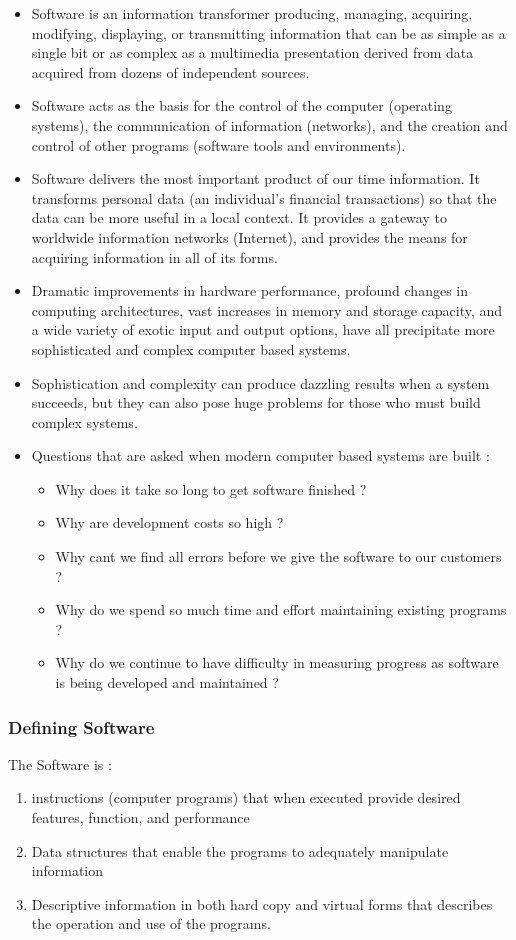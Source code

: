 \documentclass{article}
\begin{document}
	\begin{itemize}
		\item Software is an information transformer producing, managing, acquiring, modifying, displaying, or
			transmitting information that can be as simple as a single bit or as complex as a multimedia
			presentation derived from data acquired from dozens of independent sources.
		\item Software acts as the basis for the control of the computer (operating systems), the communication
			of information (networks), and the creation and control of other programs (software tools and
			environments).
		\item Software delivers the most important product of our time information.
			It transforms personal data (an individual's financial transactions) so that the data can be more
			useful in a local context.
			It provides a gateway to worldwide information networks (Internet), and provides the means for
			acquiring information in all of its forms.
		\item Dramatic improvements in hardware performance, profound changes in computing architectures, vast
			increases in memory and storage capacity, and a wide variety of exotic input and output options,
			have all precipitate more sophisticated and complex computer based systems.
		\item Sophistication and complexity can produce dazzling results when a system succeeds, but they can
			also pose huge problems for those who must build complex systems.
		\item Questions that are asked when modern computer based systems are built :
		\begin{itemize}
			\item Why does it take so long to get software finished ?
			\item Why are development costs so high ?
			\item Why cant we find all errors before we give the software to our customers ?
			\item Why do we spend so much time and effort maintaining existing programs ?
			\item Why do we continue to have difficulty in measuring progress as software is being developed and
				maintained ?
		\end{itemize}
	\end{itemize}

	\subsubsection{Defining Software}
	The Software is :
	\begin{enumerate}[label=\roman*.]
		\item instructions (computer programs) that when executed provide desired features, function, and
			performance
		\item Data structures that enable the programs to adequately manipulate information
		\item Descriptive information in both hard copy and virtual forms that describes the operation and use
			of the programs.
	\end{enumerate} \newpage
\end{document}
